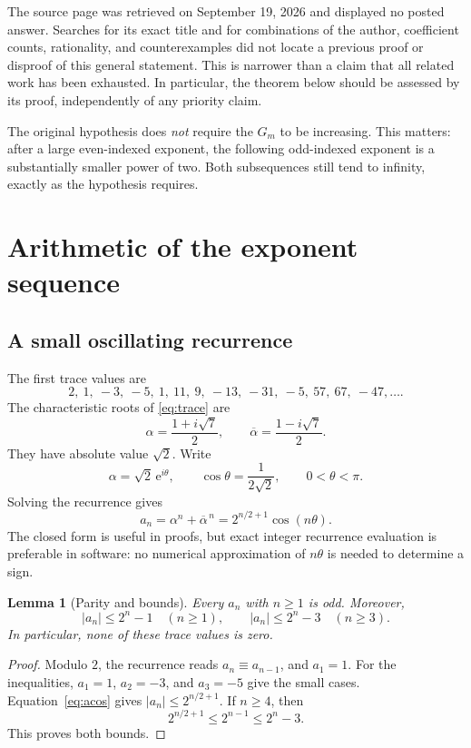 \documentclass[11pt]{article}
\newtheorem{lemma}[theorem]{Lemma}
\theoremstyle{definition}\newtheorem{definition}[theorem]{Definition}
\theoremstyle{remark}\newtheorem{remark}[theorem]{Remark}
\newcommand{\ee}{\mathrm e}
\begin{document}
The source page was retrieved on September 19, 2026 and displayed no posted answer. Searches for its exact title and for combinations of the author, coefficient counts, rationality, and counterexamples did not locate a previous proof or disproof of this general statement. This is narrower than a claim that all related work has been exhausted. In particular, the theorem below should be assessed by its proof, independently of any priority claim.

The original hypothesis does \emph{not} require the $G_m$ to be increasing. This matters: after a large even-indexed exponent, the following odd-indexed exponent is a substantially smaller power of two. Both subsequences still tend to infinity, exactly as the hypothesis requires.

\section{Arithmetic of the exponent sequence}

\subsection{A small oscillating recurrence}

The first trace values are
\[
 2,\ 1,\ -3,\ -5,\ 1,\ 11,\ 9,\ -13,\ -31,\ -5,\ 57,\ 67,\ -47,\ldots.
\]
The characteristic roots of \eqref{eq:trace} are
\begin{equation}\label{eq:alpha}
 \alpha=\frac{1+i\sqrt7}{2},\qquad \overline\alpha=\frac{1-i\sqrt7}{2}.
\end{equation}
They have absolute value $\sqrt2$. Write
\begin{equation}\label{eq:theta}
 \alpha=\sqrt2\,\ee^{i\theta},\qquad
 \cos\theta=\frac{1}{2\sqrt2},\qquad 0<\theta<\pi.
\end{equation}
Solving the recurrence gives
\begin{equation}\label{eq:acos}
 a_n=\alpha^n+\overline\alpha^{\,n}
     =2^{n/2+1}\cos(n\theta).
\end{equation}
The closed form is useful in proofs, but exact integer recurrence evaluation is preferable in software: no numerical approximation of $n\theta$ is needed to determine a sign.

\begin{lemma}[Parity and bounds]\label{lem:bounds}
Every $a_n$ with $n\geq1$ is odd. Moreover,
\begin{equation}\label{eq:abounds}
 |a_n|\leq2^n-1\quad(n\geq1),\qquad
 |a_n|\leq2^n-3\quad(n\geq3).
\end{equation}
In particular, none of these trace values is zero.
\end{lemma}
\begin{proof}
Modulo $2$, the recurrence reads $a_n\equiv a_{n-1}$, and $a_1=1$. For the inequalities, $a_1=1$, $a_2=-3$, and $a_3=-5$ give the small cases. Equation~\eqref{eq:acos} gives $|a_n|\leq2^{n/2+1}$. If $n\geq4$, then
\[
 2^{n/2+1}\leq2^{n-1}\leq2^n-3.
\]
This proves both bounds.
\end{proof}
\end{document}
